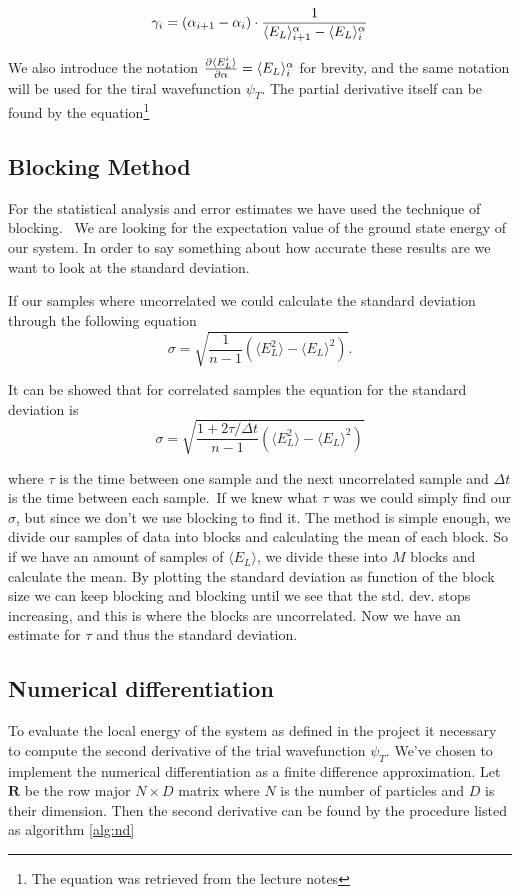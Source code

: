 \begin{equation}
\gamma_i = (\alpha_{i+1} - \alpha_i) \cdot \frac{1}{\langle E_L \rangle^\alpha_{i+1} - \langle E_L \rangle^\alpha_i}
\end{equation}

\noindent We also introduce the notation $\frac{\partial \langle E_L^i \rangle}{\partial \alpha} = \langle E_L \rangle^\alpha_{i}$ for brevity, and the same notation will be used for the tiral wavefunction $\psi_T$. The partial derivative itself can be found by the equation\footnote{The equation was retrieved from the lecture notes} 


\subsection{Blocking Method}

For the statistical analysis and error estimates we have used the technique of blocking. \
We are looking for the expectation value of the ground state energy of our system. In order to say something about how accurate these results are we want to look at the standard deviation. 

If our samples where uncorrelated we could calculate the standard deviation through the following equation 
$$\sigma = \sqrt{\frac{1}{n - 1} \left(\langle E_L^2\rangle - \langle E_L \rangle^2\right)}.$$

It can be showed that for correlated samples the equation for the standard deviation is
$$\sigma = \sqrt{\frac{1 + 2 \tau / \Delta t}{n - 1} \left(\langle E_L^2\rangle - \langle E_L \rangle^2\right)}$$

where $\tau$ is the time between one sample and the next uncorrelated sample and $\Delta t$ is the time between each sample.\
If we knew what $\tau$ was we could simply find our $\sigma$, but since we don't we use blocking to find it. The method is simple enough, we divide our samples of data into blocks and calculating the mean of each block. So if we have an amount of samples of $\langle E_L \rangle$, we divide these into $M$ blocks and calculate the mean. By plotting the standard deviation as function of the block size we can keep blocking and blocking until we see that the std. dev. stops increasing, and this is where the blocks are uncorrelated. Now we have an estimate for $\tau$ and thus the standard deviation.


\subsection{Numerical differentiation}
To evaluate the local energy of the system as defined in the project it necessary to compute the second derivative of the trial wavefunction $\psi_T$. We've chosen to implement the numerical differentiation as a finite difference approximation. Let $\mathbf{R}$ be the row major $N \times D$ matrix where $N$ is the number of particles and $D$ is their dimension. Then the second derivative can be found by the procedure listed as algorithm \ref{alg:nd}


